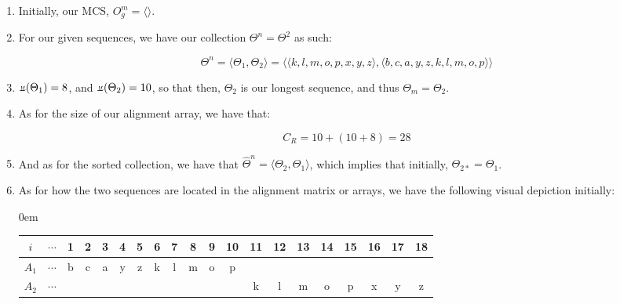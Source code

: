 \documentclass[a4paper, 18pt]{article} %
\newcommand{\invpi}{\rotatebox[origin=c]{180}{$\pi$}}
\begin{document}
\begin{enumerate}
\item Initially, our MCS, $O^m_g = \langle \rangle$.
\item{ For our given sequences, we have our collection $\Theta^n = \Theta^2$ as such:

\vspace{1em}
\begin{equation}
 \Theta^n = \langle \Theta_1, \Theta_2 \rangle = \langle \langle k, l, m, o, p, x, y, z \rangle , \langle b, c, a, y, z, k, l, m, o, p \rangle \rangle
\end{equation}
\vspace{1em}

}
\item $\invpi(\Theta_1) = 8$, and $\invpi(\Theta_2) = 10$, so that then, $\Theta_2$ is our longest sequence, and thus $\Theta_m = \Theta_2$.
\item{ As for the size of our alignment array, we have that:

\begin{equation}
C_R = 10 + (10 + 8) = 28
\end{equation}


}
\item And as for the sorted collection, we have that $\hat{\Theta}^n = \langle \Theta_2, \Theta_1 \rangle$, which implies that initially, $\Theta_{2*} = \Theta_1$.
\item{As for how the two sequences are located in the alignment matrix or arrays, we have the following visual depiction initially:

\vspace{1em}
\begin{adjustwidth}{0em}{}
\begin{tabular}[H]{|c||c|c|c|c|c|c|c|c|c|c|c|c|c|c|c|c|c|c|c|}
\hline
$i$ & $\cdots$ & 1 & 2 & 3 & 4 & 5 & 6 & 7 & 8 & 9 & 10 & 11 & 12 & 13 & 14 & 15 & 16 & 17 & 18 \\
\hline
$A_1$ & $\cdots$ & b & c & a & y & z & k & l & m & o & p &  &  &  &  &  &  &  &  \\
\hline
$A_2$ & $\cdots$ &  &  &  &  &  &  &  &  &  &  & k & l & m & o & p & x & y & z  \\
\hline
 
\end{tabular}
\end{adjustwidth}
\vspace{1em}

}
\end{enumerate}
\end{document}
